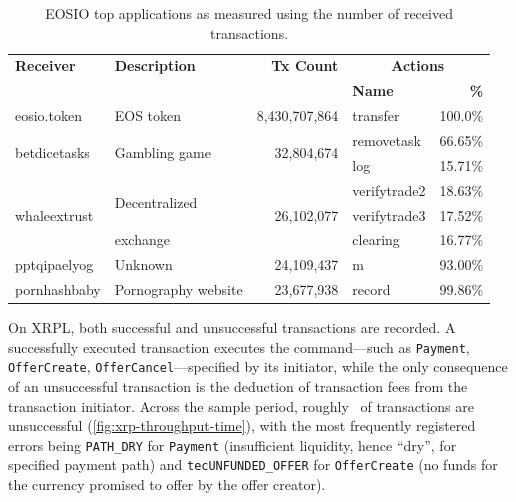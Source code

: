 \begin{table}[tb]
    \centering
    \caption[EOSIO top applications]{EOSIO top applications as measured using the number of received transactions.}
    \label{tab:eos-top-applications}
    \setlength{\tabcolsep}{2pt}
    \begin{tabular}{l l r l r}
        \toprule
        \textbf{Receiver}             & \textbf{Description}           & \textbf{Tx Count}           & \multicolumn{2}{c}{\bf Actions}           \\
                                      &                                &                             & \bf Name                        & \bf \%  \\
        \midrule
        eosio.token                   & EOS token                      & 8,430,707,864               & transfer                        & 100.0\% \\
        \midrule
        \multirow{2}{*}{betdicetasks} & \multirow{2}{*}{Gambling game} & \multirow{2}{*}{32,804,674} & removetask                      & 66.65\% \\
                                      &                                &                             & log                             & 15.71\% \\
        \midrule
        \multirow{3}{*}{whaleextrust} & \multirow{2}{*}{Decentralized} & \multirow{3}{*}{26,102,077} & verifytrade2                    & 18.63\% \\
                                      &                                &                             & verifytrade3                    & 17.52\% \\
                                      & exchange                       &                             & clearing                        & 16.77\% \\
        \midrule
        pptqipaelyog                  & Unknown                        & 24,109,437                  & m                               & 93.00\% \\
        \midrule
        pornhashbaby                  & Pornography website            & 23,677,938                  & record                          & 99.86\% \\
        \bottomrule
    \end{tabular}
\end{table}


On XRPL, both successful and unsuccessful transactions are recorded. A successfully executed transaction executes the command---such as \texttt{Payment}, \texttt{OfferCreate}, \texttt{OfferCancel}---specified by its initiator, while the only consequence of an unsuccessful transaction is the deduction of transaction fees from the transaction initiator.
Across the sample period, roughly~ of transactions are unsuccessful (\autoref{fig:xrp-throughput-time}), with the most frequently registered errors being \texttt{PATH\_DRY} for \texttt{Payment} (insufficient liquidity, hence ``dry'', for specified payment path) and \texttt{tecUNFUNDED\_OFFER} for \texttt{OfferCreate} (no funds for the currency promised to offer by the offer creator).

